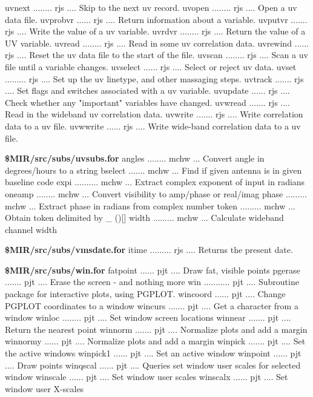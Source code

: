 {\eightpoint\begintt
uvnext ........ rjs .... Skip to the next uv record.
uvopen ........ rjs .... Open a uv data file.
uvprobvr ...... rjs .... Return information about a variable.
uvputvr ....... rjs .... Write the value of a uv variable.
uvrdvr ........ rjs .... Return the value of a UV variable.
\endtt}
{\eightpoint\begintt
uvread ........ rjs .... Read in some uv correlation data.
uvrewind ...... rjs .... Reset the uv data file to the start of the file.
uvscan ........ rjs .... Scan a uv file until a variable changes.
uvselect ...... rjs .... Select or reject uv data.
uvset ......... rjs .... Set up the uv linetype, and other massaging steps.
\endtt}
{\eightpoint\begintt
uvtrack ....... rjs .... Set flags and switches associated with a uv variable.
uvupdate ...... rjs .... Check whether any "important" variables have changed.
uvwread ....... rjs .... Read in the wideband uv correlation data.
uvwrite ....... rjs .... Write correlation data to a uv file.
uvwwrite ...... rjs .... Write wide-band correlation data to a uv file.
\endtt}
\par{\bf \$MIR/src/subs/uvsubs.for}
{\eightpoint\begintt
angles ........ mchw ... Convert angle in degrees/hours to a string
bselect ....... mchw ... Find if given antenna is in given baseline code
expi .......... mchw ... Extract complex exponent of input in radians
oneamp ........ mchw ... Convert visibility to amp/phase or real/imag
phase ......... mchw ... Extract phase in radians from complex number
\endtt}
{\eightpoint\begintt
token ......... mchw ... Obtain token delimited by _ ()[]
width ......... mchw ... Calculate wideband channel width
\endtt}
\par{\bf \$MIR/src/subs/vmsdate.for}
{\eightpoint\begintt
itime ......... rjs .... Returns the present date.
\endtt}
\par{\bf \$MIR/src/subs/win.for}
{\eightpoint\begintt
fatpoint ...... pjt .... Draw fat, visible points
pgerase ....... pjt .... Erase the screen - and nothing more
win ........... pjt .... Subroutine package for interactive plots, using PGPLOT.
wincoord ...... pjt .... Change PGPLOT coordinates to a window
wincurs ....... pjt .... Get a character from a window
\endtt}
{\eightpoint\begintt
winloc ........ pjt .... Set window screen locations
winnear ....... pjt .... Return the nearest point
winnorm ....... pjt .... Normalize plots and add a margin
winnormy ...... pjt .... Normalize plots and add a margin
winpick ....... pjt .... Set the active windows
\endtt}
{\eightpoint\begintt
winpick1 ...... pjt .... Set an active window
winpoint ...... pjt .... Draw points
winqscal ...... pjt .... Queries set window user scales for selected window
winscale ...... pjt .... Set window user scales
winscalx ...... pjt .... Set window user X-scales
\endtt}
